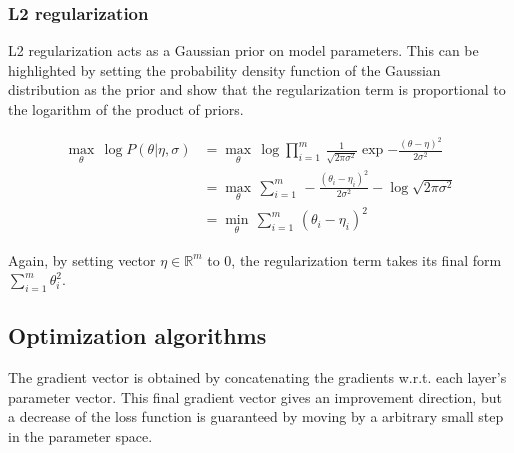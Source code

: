 	\subsubsection{L2 regularization}
		   
	   L2 regularization acts as a Gaussian prior on model parameters.
	   This can be highlighted by setting the probability density function of the Gaussian
	   distribution as the prior and show that the regularization term is proportional
	   to the logarithm of the product of priors.

	   \begin{align}
               \max_{\theta}\, \log{P(\theta \vert \eta, \sigma)}
		   & = \max_{\theta}\, \log{\prod\limits_{i=1}^m \, \frac{1}{\sqrt{2\pi\sigma^2}} 
		   \exp{-\frac{(\theta - \eta)^2}{2\sigma^2}}} \\
		   & = \max_{\theta}\, \sum\limits_{i=1}^m \, -\frac{(\theta_i - \eta_i)^2}{2\sigma^2}
		   - \log{\sqrt{2\pi\sigma^2}} \\
		   & = \min_{\theta}\, \sum\limits_{i=1}^m \, (\theta_i - \eta_i)^2 
           \end{align}

	   Again, by setting vector $\eta \in \mathbb{R}^m$ to $0$, the regularization term takes its
	   final form $\sum\limits_{i=1}^m \theta_i^2$.

    \subsection{Optimization algorithms}

        The gradient vector is obtained by concatenating the gradients w.r.t.
	each layer's parameter vector. This final gradient vector
        gives an improvement direction, but a decrease of the loss function
	is guaranteed by moving by a arbitrary small step in the parameter space.





